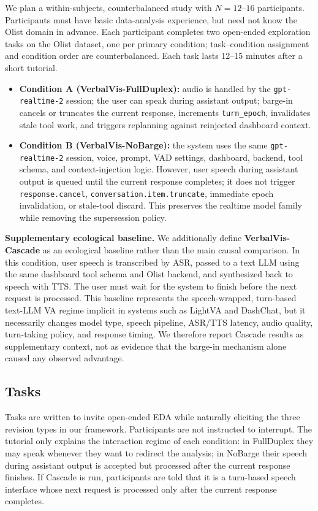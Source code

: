 \documentclass[journal]{IEEEtran}
\begin{document}
We plan a within-subjects, counterbalanced study with $N{=}12$--$16$ participants. Participants must have basic data-analysis experience, but need not know the Olist domain in advance. Each participant completes two open-ended exploration tasks on the Olist dataset, one per primary condition; task--condition assignment and condition order are counterbalanced. Each task lasts 12--15 minutes after a short tutorial.

\begin{itemize}
\item \textbf{Condition A (VerbalVis-FullDuplex):} audio is handled by the \texttt{gpt-realtime-2} session; the user can speak during assistant output; barge-in cancels or truncates the current response, increments \texttt{turn\_epoch}, invalidates stale tool work, and triggers replanning against reinjected dashboard context.
\item \textbf{Condition B (VerbalVis-NoBarge):} the system uses the same \texttt{gpt-realtime-2} session, voice, prompt, VAD settings, dashboard, backend, tool schema, and context-injection logic. However, user speech during assistant output is queued until the current response completes; it does not trigger \texttt{response.cancel}, \texttt{conversation.item.truncate}, immediate epoch invalidation, or stale-tool discard. This preserves the realtime model family while removing the supersession policy.
\end{itemize}

\noindent\textbf{Supplementary ecological baseline.}
We additionally define \textbf{VerbalVis-Cascade} as an ecological baseline rather than the main causal comparison. In this condition, user speech is transcribed by ASR, passed to a text LLM using the same dashboard tool schema and Olist backend, and synthesized back to speech with TTS. The user must wait for the system to finish before the next request is processed. This baseline represents the speech-wrapped, turn-based text-LLM VA regime implicit in systems such as LightVA and DashChat, but it necessarily changes model type, speech pipeline, ASR/TTS latency, audio quality, turn-taking policy, and response timing. We therefore report Cascade results as supplementary context, not as evidence that the barge-in mechanism alone caused any observed advantage.

\subsection{Tasks}
Tasks are written to invite open-ended EDA while naturally eliciting the three revision types in our framework. Participants are not instructed to interrupt. The tutorial only explains the interaction regime of each condition: in FullDuplex they may speak whenever they want to redirect the analysis; in NoBarge their speech during assistant output is accepted but processed after the current response finishes. If Cascade is run, participants are told that it is a turn-based speech interface whose next request is processed only after the current response completes.
\end{document}
